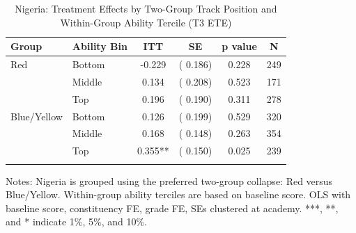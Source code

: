 \begin{table}[!htbp]
\centering
\caption{Nigeria: Treatment Effects by Two-Group Track Position and Within-Group Ability Tercile (T3 ETE)}
\label{tab:ng_track_bins}
\begin{threeparttable}
\begin{tabular}[t]{llcccc}
\toprule
Group & Ability Bin & ITT & SE & p value & N \\
\midrule
Red & Bottom &  -0.229 & (  0.186) & 0.228 & 249 \\
 & Middle &   0.134 & (  0.208) & 0.523 & 171 \\
 & Top &   0.196 & (  0.190) & 0.311 & 278 \\
\addlinespace
Blue/Yellow & Bottom &   0.126 & (  0.199) & 0.529 & 320 \\
 & Middle &   0.168 & (  0.148) & 0.263 & 354 \\
 & Top &   0.355** & (  0.150) & 0.025 & 239 \\
\addlinespace
\bottomrule
\end{tabular}
\begin{tablenotes}[para]
\item Notes: Nigeria is grouped using the preferred two-group collapse: Red versus Blue/Yellow. Within-group ability terciles are based on baseline score. OLS with baseline score, constituency FE, grade FE, SEs clustered at academy. ***, **, and * indicate 1\%, 5\%, and 10\%.
\end{tablenotes}
\end{threeparttable}
\end{table}
